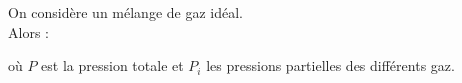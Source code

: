 ﻿\documentclass[a4paper]{article}
\begin{document}
\pagestyle{fancy}
\fancyhf{}
\setlength{\headheight}{15pt}

\begin{center}
	\large{}
\end{center}


On considère un mélange de gaz idéal. \\
Alors :
\begin{center}
\end{center}
où \(P\) est la pression totale et \(P_i\) les pressions partielles des différents gaz.
\end{document}

